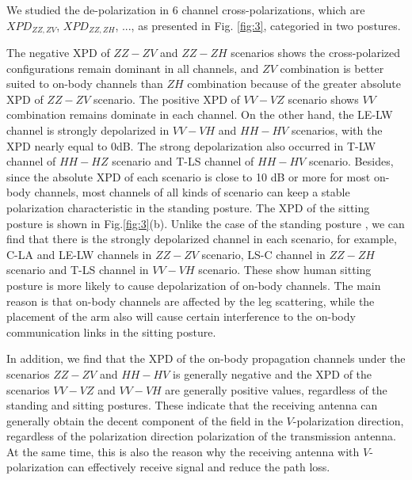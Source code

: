 \documentclass[conference]{IEEEtran}
\begin{document}
We studied the de-polarization in 6 channel cross-polarizations, which are $XPD_{ZZ,ZV}$, $XPD_{ZZ,ZH}$, ..., as presented in Fig. \ref{fig:3}, categoried in two postures.

The negative XPD of $ZZ-ZV$ and $ZZ-ZH$ scenarios shows the cross-polarized configurations remain dominant in all channels, and $ZV$ combination is better suited to on-body channels than $ZH$ combination because of the greater absolute XPD of $ZZ-ZV$ scenario. The positive XPD of $VV-VZ$ scenario shows $VV$ combination remains dominate in each channel. On the other hand, the LE-LW channel is strongly depolarized in $VV-VH$ and $HH-HV$ scenarios, with the XPD nearly equal to 0dB. The strong depolarization also occurred in T-LW channel of $HH-HZ$ scenario and T-LS channel of $HH-HV$ scenario. Besides, since the absolute XPD of each scenario is close to 10 dB or more for most on-body channels, most channels of all kinds of scenario can keep a stable polarization characteristic in the standing posture. The XPD of the sitting posture is shown in Fig.\ref{fig:3}(b). Unlike the case of  the standing posture , we can find that there is the strongly depolarized channel in each scenario, for example, C-LA and LE-LW channels in $ZZ-ZV$ scenario, LS-C channel in $ZZ-ZH$ scenario and T-LS channel in $VV-VH$ scenario. These show human sitting posture is more likely to cause depolarization of on-body channels. The main reason is that on-body channels are affected by the leg scattering, while the placement of the arm also will cause certain interference to the on-body communication links in the sitting posture.

In addition, we find that the XPD of the on-body propagation channels under the scenarios $ZZ-ZV$ and $HH-HV$ is generally negative and the XPD of the scenarios $VV-VZ$ and $VV-VH$ are generally positive values, regardless of the standing and sitting postures. These indicate that the receiving antenna can generally obtain the decent component of the field in the $V$-polarization direction, regardless of the polarization direction polarization of the transmission antenna. At the same time, this is also the reason why the receiving antenna with $V$-polarization can effectively receive signal and reduce the path loss.
\end{document}

